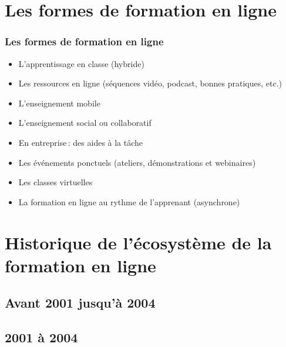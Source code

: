 \section{Les formes de formation en ligne} 
\begin{frame}
\frametitle{Les formes de formation en ligne}
\begin{itemize}
\item L'apprentissage en classe (hybride)
\item Les ressources en ligne (séquences vidéo, podcast, bonnes pratiques, etc.)
\item L'enseignement mobile
\item L'enseignement social ou collaboratif 
\item En entreprise\,: des aides à la tâche
\item Les événements ponctuels (ateliers, démonstrations et webinaires)
\item Les classes virtuelles
\item La formation en ligne au rythme de l’apprenant (asynchrone)

\end{itemize}
\end{frame}


\section{Historique de l’écosystème de la formation en ligne} 
\subsection{Avant 2001 jusqu’à 2004}

\subsection{2001 à 2004}


